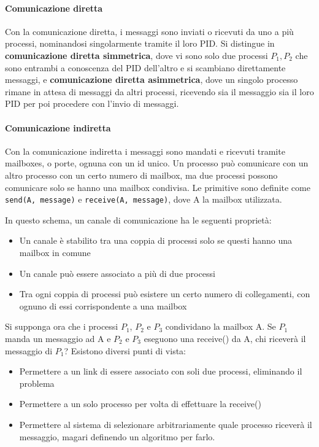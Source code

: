 \documentclass[a4paper]{article}
\begin{document}
\paragraph{Comunicazione diretta}
Con la comunicazione diretta, i messaggi sono inviati o ricevuti da uno a più processi, nominandosi singolarmente tramite il loro PID. Si distingue in \textbf{comunicazione diretta simmetrica}, dove vi sono solo due processi $P_1, P_2$ che sono entrambi a conoscenza del PID dell'altro e si scambiano direttamente messaggi, e \textbf{comunicazione diretta asimmetrica}, dove un singolo processo rimane in attesa di messaggi da altri processi, ricevendo sia il messaggio sia il loro PID per poi procedere con l'invio di messaggi.

\paragraph{Comunicazione indiretta}
Con la comunicazione indiretta i messaggi sono mandati e ricevuti tramite mailboxes, o porte, ognuna con un id unico. Un processo può comunicare con un altro processo con un certo numero di mailbox, ma due processi possono comunicare solo se hanno una mailbox condivisa. Le primitive sono definite come \texttt{send(A, message)} e \texttt{receive(A, message)}, dove A la mailbox utilizzata.

In questo schema, un canale di comunicazione ha le seguenti proprietà:
\begin{itemize}
    \item Un canale è stabilito tra una coppia di processi solo se questi hanno una mailbox in comune
    \item Un canale può essere associato a più di due processi
    \item Tra ogni coppia di processi può esistere un certo numero di collegamenti, con ognuno di essi corrispondente a una mailbox
\end{itemize}

Si supponga ora che i processi $P_1$, $P_2$ e $P_3$ condividano la mailbox A. Se $P_1$ manda un messaggio ad A e $P_2$ e $P_3$ eseguono una receive() da A, chi riceverà il messaggio di $P_1$? Esistono diversi punti di vista:
\begin{itemize}
    \item Permettere a un link di essere associato con soli due processi, eliminando il problema
    \item Permettere a un solo processo per volta di effettuare la receive()
    \item Permettere al sistema di selezionare arbitrariamente quale processo riceverà il messaggio, magari definendo un algoritmo per farlo.
\end{itemize}
\end{document}
